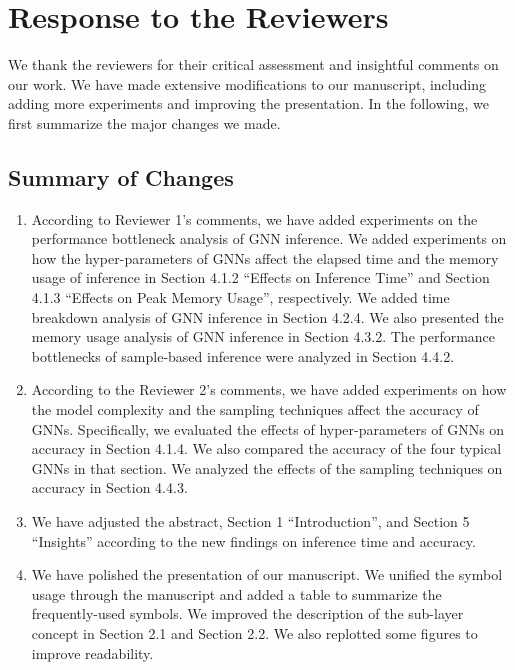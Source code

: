 \documentclass[12pt]{article}
\newcounter{reviewer}
\newcounter{point}[reviewer]
\begin{document}
\section*{Response to the Reviewers}
We thank the reviewers for their critical assessment and insightful comments on our work.
%
We have made extensive modifications to our manuscript, including adding more experiments and improving the presentation.
%
In the following, we first summarize the major changes we made.
%
%

\subsection*{Summary of Changes}

\begin{enumerate}
\item According to Reviewer 1's comments, we have added experiments on the performance bottleneck analysis of GNN inference.
%
We added experiments on how the hyper-parameters of GNNs affect the elapsed time and the memory usage of inference in Section 4.1.2 ``Effects on Inference Time'' and Section 4.1.3 ``Effects on Peak Memory Usage'', respectively.
%
We added time breakdown analysis of GNN inference in Section 4.2.4.
%
We also presented the memory usage analysis of GNN inference in Section 4.3.2.
%
The performance bottlenecks of sample-based inference were analyzed in Section 4.4.2.

\item According to the Reviewer 2's comments, we have added experiments on how the model complexity and the sampling techniques affect the accuracy of GNNs.
%
Specifically, we evaluated the effects of hyper-parameters of GNNs on accuracy in Section 4.1.4.
%
We also compared the accuracy of the four typical GNNs in that section.
%
We analyzed the effects of the sampling techniques on accuracy in Section 4.4.3.

\item We have adjusted the abstract, Section 1 ``Introduction'', and Section 5 ``Insights'' according to the new findings on inference time and accuracy.

\item We have polished the presentation of our manuscript.
%
We unified the symbol usage through the manuscript and added a table to summarize the frequently-used symbols.
%
We improved the description of the sub-layer concept in Section 2.1 and Section 2.2.
%
We also replotted some figures to improve readability.


\end{enumerate}
\end{document}
